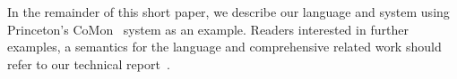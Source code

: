 In the remainder of this short paper, we describe our language and system
using Princeton's CoMon~\cite{comon} system as an example.
Readers interested in further examples,
a semantics for the language and comprehensive related work
should refer to our technical report~\cite{zhu+:padsdtr}.


